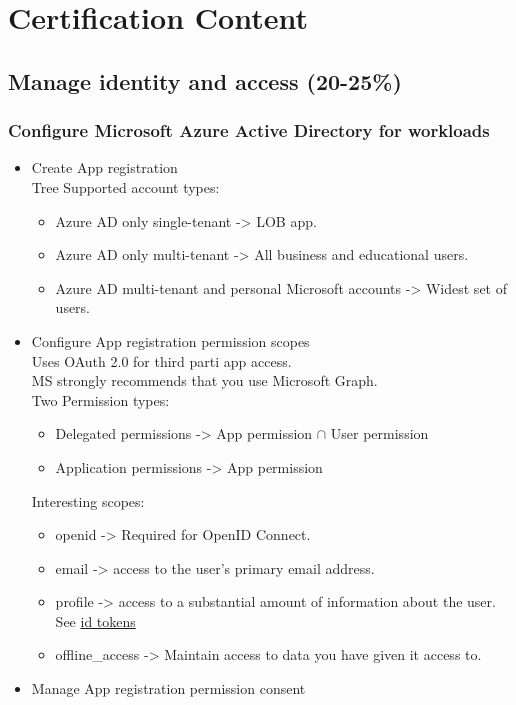 \section{Certification Content}

\subsection{Manage identity and access (20-25\%)}

\subsubsection{Configure Microsoft Azure Active Directory for workloads}
\begin{itemize}
\item Create App registration \\
Tree Supported account types:
	\begin{itemize}
	\item Azure AD only single-tenant -> LOB app.
	\item Azure AD only multi-tenant -> All business and educational users.
	\item Azure AD multi-tenant and personal Microsoft accounts -> Widest set of users.
	\end{itemize}
\item Configure App registration permission scopes \\
Uses OAuth 2.0 for third parti app access.\\
MS strongly recommends that you use Microsoft Graph. \\
Two Permission types:
	\begin{itemize}
	\item Delegated permissions -> App permission $\cap$ User permission 
	\item Application permissions -> App permission  
	\end{itemize}
Interesting scopes: 
	\begin{itemize}
	\item openid -> Required for OpenID Connect.
	\item email -> access to the user's primary email address.
	\item profile -> access to a substantial amount of information about the user. See \href{https://docs.microsoft.com/en-us/azure/active-directory/develop/id-tokens}{id tokens}
	\item offline\_access -> Maintain access to data you have given it access to.
	\end{itemize}
\item Manage App registration permission consent 


\end{itemize}
